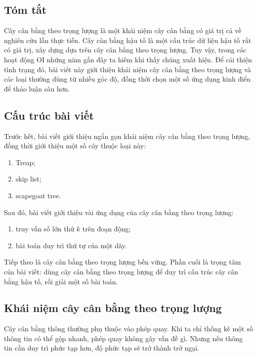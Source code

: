 \documentclass[11pt]{article}
\begin{document}
\subsection*{Tóm tắt}

Cây cân bằng theo trọng lượng là một khái niệm cây cân bằng có giá trị cả về
nghiên cứu lẫn thực tiễn. Cây cân bằng hậu tố là một cấu trúc dữ liệu hậu tố
rất có giá trị, xây dựng dựa trên cây cân bằng theo trọng lượng. Tuy vậy,
trong các hoạt động OI những năm gần đây ta hiếm khi thấy chúng xuất hiện.
Để cải thiện tình trạng đó, bài viết này giới thiệu khái niệm cây cân bằng
theo trọng lượng và các loại thường dùng từ nhiều góc độ, đồng thời chọn một
số ứng dụng kinh điển để thảo luận sâu hơn.

\subsection{Cấu trúc bài viết}

Trước hết, bài viết giới thiệu ngắn gọn khái niệm cây cân bằng theo trọng
lượng, đồng thời giới thiệu một số cây thuộc loại này:
\begin{enumerate}
  \item Treap;
  \item skip list;
  \item scapegoat tree.
\end{enumerate}

Sau đó, bài viết giới thiệu vài ứng dụng của cây cân bằng theo trọng lượng:
\begin{enumerate}
  \item truy vấn số lớn thứ \(k\) trên đoạn động;
  \item bài toán duy trì thứ tự của một dãy.
\end{enumerate}

Tiếp theo là cây cân bằng theo trọng lượng bền vững. Phần cuối là trọng tâm
của bài viết: dùng cây cân bằng theo trọng lượng để duy trì cấu trúc cây cân
bằng hậu tố, rồi giải một số bài toán.

\subsection{Khái niệm cây cân bằng theo trọng lượng}

Cây cân bằng thông thường phụ thuộc vào phép quay. Khi ta chỉ thống kê một
số thông tin có thể gộp nhanh, phép quay không gây vấn đề gì. Nhưng nếu
thông tin cần duy trì phức tạp hơn, độ phức tạp sẽ trở thành trở ngại.
\end{document}
